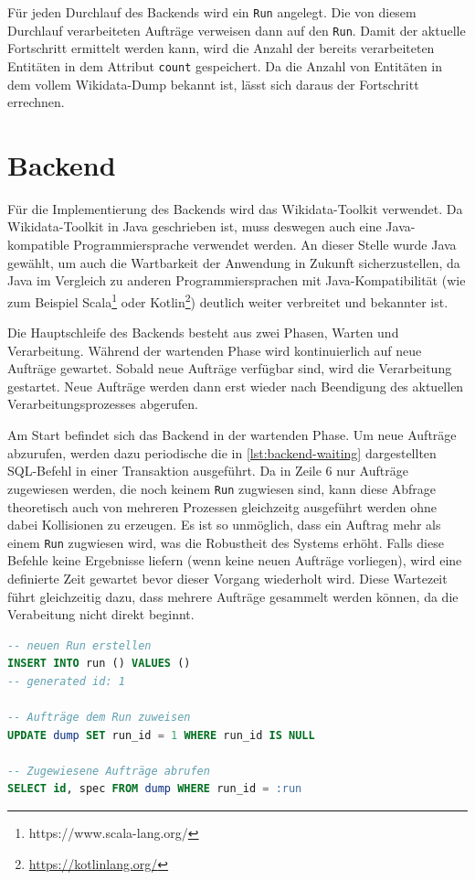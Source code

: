 Für jeden Durchlauf des Backends wird ein \verb|Run| angelegt.
Die von diesem Durchlauf verarbeiteten Aufträge verweisen dann auf den \verb|Run|.
Damit der aktuelle Fortschritt ermittelt werden kann, wird die Anzahl der bereits verarbeiteten Entitäten in dem Attribut \verb|count| gespeichert.
Da die Anzahl von Entitäten in dem vollem Wikidata-Dump bekannt ist, lässt sich daraus der Fortschritt errechnen.

\section{Backend}
Für die Implementierung des Backends wird das Wikidata-Toolkit verwendet.
Da Wikidata-Toolkit in Java geschrieben ist, muss deswegen auch eine Java-kompatible Programmiersprache verwendet werden.
An dieser Stelle wurde Java gewählt, um auch die Wartbarkeit der Anwendung in Zukunft sicherzustellen, da Java im Vergleich zu anderen Programmiersprachen mit Java-Kompatibilität (wie zum Beispiel Scala\footnote{https://www.scala-lang.org/} oder Kotlin\footnote{\url{https://kotlinlang.org/}}) deutlich weiter verbreitet und bekannter ist.

Die Hauptschleife des Backends besteht aus zwei Phasen, Warten und Verarbeitung.
Während der wartenden Phase wird kontinuierlich auf neue Aufträge gewartet.
Sobald neue Aufträge verfügbar sind, wird die Verarbeitung gestartet. 
Neue Aufträge werden dann erst wieder nach Beendigung des aktuellen Verarbeitungsprozesses abgerufen.

Am Start befindet sich das Backend in der wartenden Phase.
Um neue Aufträge abzurufen, werden dazu periodische die in \cref{lst:backend-waiting} dargestellten SQL-Befehl in einer Transaktion ausgeführt.
Da in Zeile 6 nur Aufträge zugewiesen werden, die noch keinem \verb|Run| zugwiesen sind, kann diese Abfrage theoretisch auch von mehreren Prozessen gleichzeitg ausgeführt werden ohne dabei Kollisionen zu erzeugen.
Es ist so unmöglich, dass ein Auftrag mehr als einem \verb|Run| zugwiesen wird, was die Robustheit des Systems erhöht.
Falls diese Befehle keine Ergebnisse liefern (wenn keine neuen Aufträge vorliegen), wird eine definierte Zeit gewartet bevor dieser Vorgang wiederholt wird.
Diese Wartezeit führt gleichzeitig dazu, dass mehrere Aufträge gesammelt werden können, da die Verabeitung nicht direkt beginnt.

\begin{lstlisting}[language=SQL, caption={Abrufen neuer Aufträge}, label={lst:backend-waiting}]
-- neuen Run erstellen
INSERT INTO run () VALUES ()
-- generated id: 1

-- Aufträge dem Run zuweisen
UPDATE dump SET run_id = 1 WHERE run_id IS NULL

-- Zugewiesene Aufträge abrufen
SELECT id, spec FROM dump WHERE run_id = :run
\end{lstlisting}

